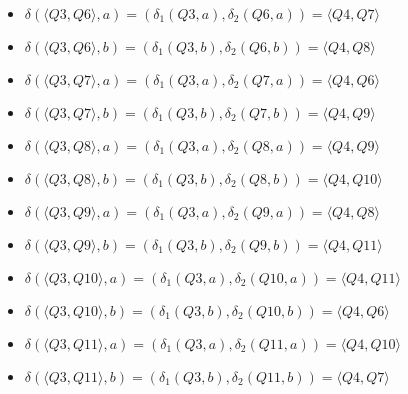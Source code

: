 \documentclass[12pt, a4paper]{article}
\begin{document}
\begin{enumerate}
\begin{itemize}
\begin{itemize}
        \item \(\delta(\langle Q3,Q6 \rangle,a)=(\delta_1(Q3,a),\delta_2(Q6,a))=\langle Q4,Q7 \rangle\)
        \item \(\delta(\langle Q3,Q6 \rangle,b)=(\delta_1(Q3,b),\delta_2(Q6,b))=\langle Q4,Q8 \rangle\)
        \item \(\delta(\langle Q3,Q7 \rangle,a)=(\delta_1(Q3,a),\delta_2(Q7,a))=\langle Q4,Q6 \rangle\)
        \item \(\delta(\langle Q3,Q7 \rangle,b)=(\delta_1(Q3,b),\delta_2(Q7,b))=\langle Q4,Q9 \rangle\)
        \item \(\delta(\langle Q3,Q8 \rangle,a)=(\delta_1(Q3,a),\delta_2(Q8,a))=\langle Q4,Q9 \rangle\)
        \item \(\delta(\langle Q3,Q8 \rangle,b)=(\delta_1(Q3,b),\delta_2(Q8,b))=\langle Q4,Q10 \rangle\)
        \item \(\delta(\langle Q3,Q9 \rangle,a)=(\delta_1(Q3,a),\delta_2(Q9,a))=\langle Q4,Q8 \rangle\)
        \item \(\delta(\langle Q3,Q9 \rangle,b)=(\delta_1(Q3,b),\delta_2(Q9,b))=\langle Q4,Q11 \rangle\)
        \item \(\delta(\langle Q3,Q10 \rangle,a)=(\delta_1(Q3,a),\delta_2(Q10,a))=\langle Q4,Q11 \rangle\)
        \item \(\delta(\langle Q3,Q10 \rangle,b)=(\delta_1(Q3,b),\delta_2(Q10,b))=\langle Q4,Q6 \rangle\)
        \item \(\delta(\langle Q3,Q11 \rangle,a)=(\delta_1(Q3,a),\delta_2(Q11,a))=\langle Q4,Q10 \rangle\)
        \item \(\delta(\langle Q3,Q11 \rangle,b)=(\delta_1(Q3,b),\delta_2(Q11,b))=\langle Q4,Q7 \rangle\)
        

\end{itemize}
\end{itemize}
\end{enumerate}
\end{document}

